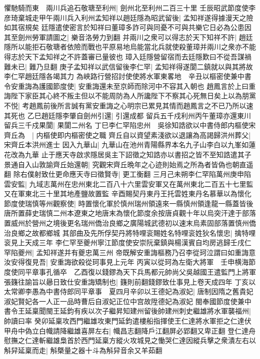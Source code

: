 懼馳騎而東　兩川兵追石敬瑭至利州|{
	劍州北至利州二百三十里}
壬辰昭武節度使李彦琦棄城走甲午兩川兵入利州孟知祥以趙廷隱為昭武留後|{
	孟知祥遂得據漫天之險如其宿規矣}
廷隱遣使密言於知祥曰董璋多詐可與同憂不可與共樂它日必為公患因其至劍州勞軍請圖之|{
	樂音洛勞力到翻}
并兩川之衆可以得志於天下知祥不許|{
	趙廷隱所以能拒石敬瑭者依險而戰也平原易地烏能當北兵就使殺董璋并兩川之衆亦不能得志於天下孟知祥之不許蓋審已量彼也}
璋入廷隱營留宿而去廷隱歎曰不從吾謀禍難未已|{
	難乃旦翻}
庚子孟知祥以武信留後李仁罕|{
	孟知祥得遂閬二鎮就以與其將故李仁罕趙廷隱各竭其力}
為峽路行營招討使使將水軍東畧地　辛丑以樞密使兼中書令安重誨為護國節度使|{
	安重誨還未至京師而除河中不容其入朝也}
趙鳳言於上曰重誨陛下家臣其心終不叛主但以不能周防為人所讒陛下不察其心死無日矣上以為朋黨不悦|{
	考趙鳳前後所言誠有黨安重誨之心明宗已累見其情而趙鳳言之不已乃所以速其死也}
乙巳趙廷隱李肇自劍州引還|{
	引還成都}
留兵五千戍利州丙午董璋亦還東川留兵三千戍果閬|{
	果閬二州名}
丁巳李仁罕陷忠州　吳徐知誥欲以中書侍郎内樞使宋齊丘為　|{
	内樞使即内樞密使之職}
齊丘自以資望素淺欲以退讓為高謁歸洪州葬父|{
	宋齊丘本洪州進士}
因入九華山|{
	九華山在池州青陽縣界本名九子山李白以九峯如蓮花改為九華}
止于應天寺啟求隱居吳主下詔徵之知誥亦以書招之皆不至知誥遣其子景通自入山敦諭齊丘始還朝|{
	究觀宋齊丘晩年之心迹則始焉之所為者皆偽也朝直遥翻}
除右僕射致仕更命應天寺曰徵賢寺|{
	更工衡翻}
三月己未朔李仁罕陷萬州庚申陷雲安監|{
	九域志萬州在忠州東北二百八十六里雲安軍又在萬州東北二百五十七里監又在軍東北三十里其地產鹽故置監}
辛酉賜契丹東丹王托雲姓東丹名慕華以為懷化節度使瑞慎等州觀察使|{
	時置懷化軍於慎州瑞州領遠來一縣慎州領逢龍一縣蓋皆後唐所置薛史瑞慎二州本遼東之地唐末為懷化節度余按唐貞觀十年以烏突汗達于部落置威州於營州之境後更名瑞州僑治良鄉之廣陽城武德初以速末烏素固部落置慎州僑治良鄉之故都鄉城}
其部曲及先所俘契丹將特哩衮賜姓名特哩衮姓狄名懷忠|{
	擒特哩衮見上天成三年}
李仁罕至夔州寧江節度使安崇阮棄鎮與楊漢賓自均房逃歸壬戌仁罕陷夔州|{
	孟知祥遂并有夔忠萬三州}
帝既解安重誨樞務乃召李從珂泣謂曰如重誨意汝安得復見吾|{
	安重誨欲殺從珂事見上元年}
丙寅以從珂為左衛大將軍　壬申横海節度使同平章事孔循卒　乙酉復以錢鏐為天下兵馬都元帥尚父吳越國王遣監門上將軍張籛往諭旨以曏日致仕安重誨矯制也|{
	籛則前翻錢鏐致仕事見上卷天成四年}
丁亥以太常卿李愚為中書侍郎同平章事　夏四月辛卯以王德妃為淑妃|{
	唐制因隋之舊貴妃淑妃賢妃各一人正一品時曹后自淑妃正位中宫故陞德妃為淑妃}
閩奉國節度使兼中書令王延稟聞閩王延鈞有疾以次子繼昇知建州留後帥建州刺史繼雄將水軍襲福州|{
	帥讀曰率}
癸卯延稟攻西門繼雄攻東門延鈞遣樓船指揮使王仁達將水軍拒之仁達伏甲舟中偽立白幟請降繼雄喜屏左右|{
	幟昌志翻降戶江翻屏必郢翻又卑正翻}
登仁達舟慰撫之仁達斬繼雄梟首於西門延稟方縱火攻城見之慟哭仁達因縱兵擊之衆潰左右以斛舁延稟而走|{
	斛槩量之器十斗為斛舁音余又羊茹翻}
